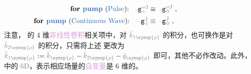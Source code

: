 \begin{subequations} \label{eq:Nondepleted-Pump-Approximation}
\begin{align}
	\hspace{-7em} \text{\textbf{for \textcolor{NavyBlue}{pump}} (\textcolor{NavyBlue}{Pulse}):} \hspace{0.65em} \Xint{\begin{smallmatrix} ~ \\ {}^{}_{\mathcolor{gray}{-}} \\ ~ \end{smallmatrix}}{09}{\mathtt{g}}^{\;\! \mathcolor{gray}{\omega} \textcolor{PineGreen}{\hat{\jmath}}}_{\;\! \mathcolor{gray}{z}} &\equiv \Xint{\begin{smallmatrix} ~ \\ {}^{}_{\mathcolor{gray}{-}} \\ ~ \end{smallmatrix}}{09}{\mathtt{g}}^{\;\!  \mathcolor{gray}{\omega} \textcolor{PineGreen}{\hat{\jmath}}}_{\;\! \mathcolor{gray}{0}} ~, \label{eq:Nondepleted-Pump-Approximation-spectrum} \\
	\hspace{-7em} \text{\textbf{for \textcolor{NavyBlue}{pump}} (\textcolor{NavyBlue}{Continuous Wave}):} \hspace{1em} \Xint{\begin{smallmatrix} ~ \\ {}^{}_{\mathcolor{gray}{-}} \\ ~ \end{smallmatrix}}{09}{\mathtt{g}}^{\;\! \textcolor{PineGreen}{\hat{\jmath}}}_{\;\! \mathcolor{gray}{z}} &\equiv \Xint{\begin{smallmatrix} ~ \\ {}^{}_{\mathcolor{gray}{-}} \\ ~ \end{smallmatrix}}{09}{\mathtt{g}}^{\;\! \textcolor{PineGreen}{\hat{\jmath}}}_{\;\! \mathcolor{gray}{0}} ~, \label{eq:Nondepleted-Pump-Approximation-discrete}
\end{align}
\end{subequations}
注意， 的 4 维\textcolor{Plum}{非线性卷积}相关项中，对 $\mathcolor{gray}{\bar{k}_{1\symup{\rho}}}$ 的积分，也可换作是对 $\mathcolor{gray}{\bar{k}_{2\symup{\rho}}}$ 的积分，只需将上述  更改为 $\mathcolor{gray}{\bar{k}_{1\symup{\rho}}} := \mathcolor{gray}{\bar{k}_{\symup{\rho}}} - \mathcolor{gray}{\bar{k}_{2\symup{\rho}}} - \mathcolor{gray}{\bar{q}_{\symup{\rho}}}$ 即可，其他不必作改动。此外， 中的 \textcolor{gray}{6D}，表示相应\textcolor{NavyBlue}{场量}的\textcolor{Plum}{自变量}是 6 维的。


